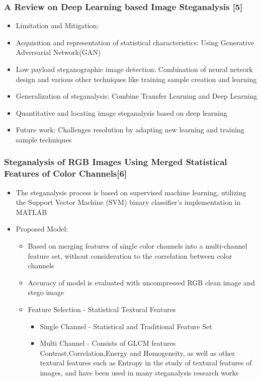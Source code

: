 \documentclass{beamer} %
\theoremstyle{definition} %
\begin{document}
\begin{frame}
\frametitle{A Review on Deep Learning based Image Steganalysis [5]   }
\begin{itemize}
	\item{Limitation and Mitigation:}
\end{itemize}
	\begin{itemize}
		\item {Acquisition and representation of statistical characteristics: Using  Generative Adversarial Network(GAN)  }
		\item {Low payload steganographic image detection: Combination of neural neteork design and various other techniques like training sample creation and learning }
		\item {Generalization of steganalysis: Combine Transfer Learning and Deep Learning}
		\item {Quantitative and locating image steganalysis based on
			deep learning }
	\end{itemize}
\begin{itemize}
	\item{Future work: Challenges resolution by adapting new learning and training sample techniques  }
\end{itemize}
\end{frame}

\begin{frame}
\frametitle{Steganalysis of RGB Images Using Merged Statistical Features of Color Channels[6]  }
\begin{itemize}
	\item The steganalysis process is based on supervised machine learning, utilizing the Support Vector Machine (SVM) binary classifier’s implementation in MATLAB 
	\item Proposed Model:
	\begin{itemize}
        \item{Based on merging features of single color channels into a multi-channel feature set, without consideration to the correlation between color channels  }
        \item{Accuracy of model is evaluated with uncompressed RGB clean image and stego image  }
     \item Feature Selection - Statistical Textural Features
     \begin{itemize}
     	\item Single Channel - Statistical and Traditional Feature Set 
     	\item Multi Channel -  Consists of GLCM features Contrast,Correlation,Energy and Homogeneity, as well as other textural features such as Entropy in the study of textural features of images, and have been used in many steganalysis research works 
     \end{itemize}
	\end{itemize}
\end{itemize}
\end{frame}
\end{document}
